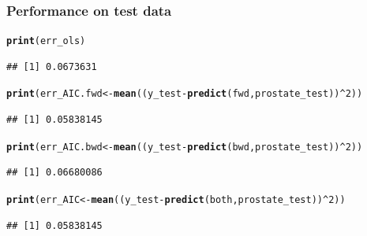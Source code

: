 \documentclass{beamer}\usepackage[]{graphicx}\usepackage[]{color}
\makeatletter
\newcommand{\hlnum}[1]{\textcolor[rgb]{0.686,0.059,0.569}{#1}}%
\newcommand{\hlopt}[1]{\textcolor[rgb]{0,0,0}{#1}}%
\newcommand{\hlstd}[1]{\textcolor[rgb]{0.345,0.345,0.345}{#1}}%
\newcommand{\hlkwb}[1]{\textcolor[rgb]{0.69,0.353,0.396}{#1}}%
\newcommand{\hlkwd}[1]{\textcolor[rgb]{0.737,0.353,0.396}{\textbf{#1}}}%
\newenvironment{kframe}{%
 \def\at@end@of@kframe{}%
 \ifinner\ifhmode%
  \def\at@end@of@kframe{\end{minipage}}%
  \begin{minipage}{\columnwidth}%
 \fi\fi%
 \def\FrameCommand##1{\hskip\@totalleftmargin \hskip-\fboxsep
 \colorbox{shadecolor}{##1}\hskip-\fboxsep
     \hskip-\linewidth \hskip-\@totalleftmargin \hskip\columnwidth}%
 \MakeFramed {\advance\hsize-\width
   \@totalleftmargin\z@ \linewidth\hsize
   \@setminipage}}%
 {\par\unskip\endMakeFramed%
 \at@end@of@kframe}
\newenvironment{knitrout}{}{} %
\makeatother
\begin{document}
\begin{frame}[fragile]
  \frametitle{Performance on test data}

\begin{knitrout}\scriptsize
{}\color{fgcolor}\begin{kframe}
\begin{alltt}
\hlkwd{print}\hlstd{(err_ols)}
\end{alltt}
\begin{verbatim}
## [1] 0.0673631
\end{verbatim}
\begin{alltt}
\hlkwd{print}\hlstd{(err_AIC.fwd}  \hlkwb{<-} \hlkwd{mean}\hlstd{((y_test} \hlopt{-} \hlkwd{predict}\hlstd{(fwd , prostate_test))}\hlopt{^}\hlnum{2}\hlstd{))}
\end{alltt}
\begin{verbatim}
## [1] 0.05838145
\end{verbatim}
\begin{alltt}
\hlkwd{print}\hlstd{(err_AIC.bwd}  \hlkwb{<-} \hlkwd{mean}\hlstd{((y_test} \hlopt{-} \hlkwd{predict}\hlstd{(bwd , prostate_test))}\hlopt{^}\hlnum{2}\hlstd{))}
\end{alltt}
\begin{verbatim}
## [1] 0.06680086
\end{verbatim}
\begin{alltt}
\hlkwd{print}\hlstd{(err_AIC} \hlkwb{<-} \hlkwd{mean}\hlstd{((y_test} \hlopt{-} \hlkwd{predict}\hlstd{(both, prostate_test))}\hlopt{^}\hlnum{2}\hlstd{))}
\end{alltt}
\begin{verbatim}
## [1] 0.05838145
\end{verbatim}
\end{kframe}
\end{knitrout}

\end{frame}
\end{document}
